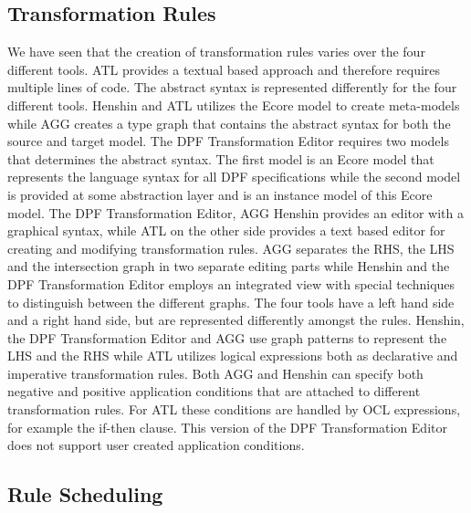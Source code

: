 \subsection{Transformation Rules}
We have seen that the creation of transformation rules varies over the four
different tools. ATL provides a textual based approach and therefore requires
multiple lines of code. The abstract syntax is represented differently for
the four different tools. Henshin and ATL utilizes the Ecore model to create
meta-models while AGG creates a type graph that contains the abstract syntax
for both the source and target model. The DPF Transformation Editor requires two
models that determines the abstract syntax. The first model is an
Ecore model that represents the language syntax for all DPF specifications while
the second model is provided at some abstraction layer and is an instance model
of this Ecore model. The DPF Transformation Editor, AGG Henshin provides an
editor with a graphical syntax, while ATL on the other side provides a text
based editor for creating and modifying transformation rules. AGG separates the
RHS, the LHS and the intersection graph in two separate editing parts while
Henshin and the DPF Transformation Editor employs an integrated view with
special techniques to distinguish between the different graphs.
The four tools have a left hand side and a right hand side, but are represented
differently amongst the rules. Henshin, the DPF Transformation Editor and AGG
use graph patterns to represent the LHS and the RHS while ATL utilizes logical
expressions both as declarative and imperative transformation rules. Both AGG
and Henshin can specify both negative and positive application conditions that
are attached to different transformation rules. For ATL these conditions are
handled by OCL expressions, for example the if-then clause. This version of the
DPF Transformation Editor does not support user created application conditions. 

\subsection{Rule Scheduling}

